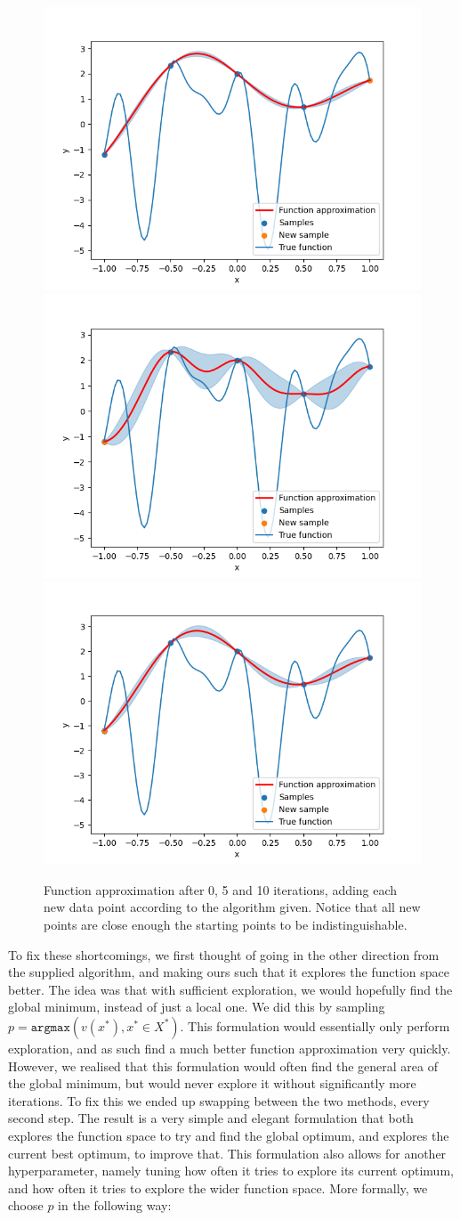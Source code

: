 \begin{figure}[h]
\centering
\includegraphics[width=0.3\linewidth]{images/bayesian_optimization_0.png}
\includegraphics[width=0.3\linewidth]{images/bayesian_optimization_4.png}
\includegraphics[width=0.3\linewidth]{images/bayesian_optimization_9.png}
\setlength{\belowcaptionskip}{-10pt}
\caption{Function approximation after 0, 5 and 10 iterations, adding each new data point according to the algorithm given. Notice that all new points are close enough the starting points to be indistinguishable.}
\label{fig:iter_naive}
\end{figure}

To fix these shortcomings, we first thought of going in the other direction from the supplied algorithm, and making ours such that it explores the function space better. The idea was that with sufficient exploration, we would hopefully find the global minimum, instead of just a local one. We did this by sampling $p = \texttt{argmax} \left( v(x^*), x^* \in X^*\right)$. This formulation would essentially only perform exploration, and as such find a much better function approximation very quickly. However, we realised that this formulation would often find the general area of the global minimum, but would never explore it without significantly more iterations. To fix this we ended up swapping between the two methods, every second step. The result is a very simple and elegant formulation that both explores the function space to try and find the global optimum, and explores the current best optimum, to improve that. This formulation also allows for another hyperparameter, namely tuning how often it tries to explore its current optimum, and how often it tries to explore the wider function space. More formally, we choose $p$ in the following way:

